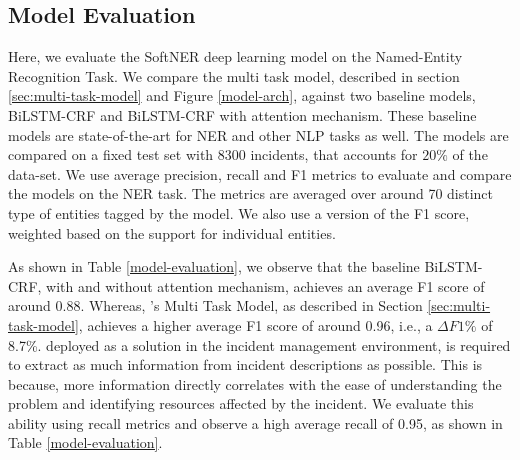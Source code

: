 \subsection{\softner{} Model Evaluation}
Here, we evaluate the SoftNER deep learning model on the Named-Entity Recognition Task. We compare the multi task model, described in section \ref{sec:multi-task-model} and Figure \ref{model-arch}, against two baseline models, BiLSTM-CRF and BiLSTM-CRF with attention mechanism. These baseline models are state-of-the-art for NER \cite{huang2015bidirectional,lample2016neural, chiu2016named} and other NLP tasks as well. The models are compared on a fixed test set with 8300 incidents, that accounts for $20\%$ of the data-set. We use average precision, recall and F1 metrics to evaluate and compare the models on the NER task. The metrics are averaged over around 70 distinct type of entities tagged by the model. We also use a version of the F1 score, weighted based on the support for individual entities.

As shown in Table \ref{model-evaluation}, we observe that the baseline BiLSTM-CRF, with and without attention mechanism, achieves an average F1 score of around 0.88. Whereas, \softner{}'s Multi Task Model, as described in Section \ref{sec:multi-task-model}, achieves a higher average F1 score of around 0.96, i.e., a $\Delta F1\%$ of 8.7\%. \softner{} deployed as a solution in the incident management environment, is required to extract as much information from incident descriptions as possible. This is because, more information directly correlates with the ease of understanding the problem and identifying resources affected by the incident. We evaluate this ability using recall metrics and observe a high average recall of 0.95, as shown in Table \ref{model-evaluation}.

